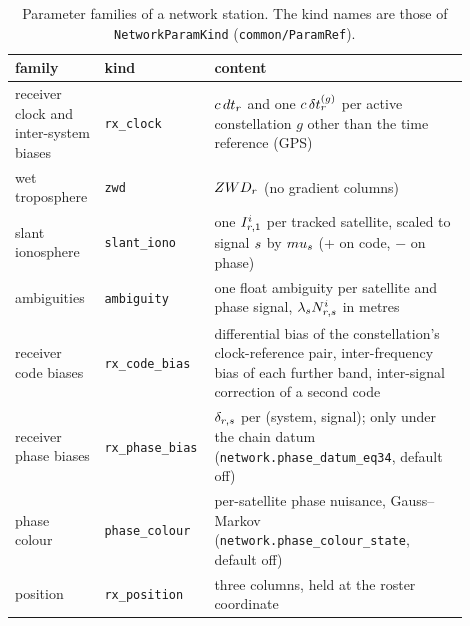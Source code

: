 \documentclass[main.tex]{subfiles}
\begin{document}
\begin{table}[tbp]
\centering
\caption{Parameter families of a network station. The kind names are
those of \texttt{NetworkParamKind} (\texttt{common/ParamRef}).}
\label{tab:net-params}
\footnotesize
\begin{tabular}{@{}>{\raggedright\arraybackslash}p{0.19\linewidth}>{\raggedright\arraybackslash}p{0.17\linewidth}>{\raggedright\arraybackslash}p{0.54\linewidth}@{}}
\toprule
family & kind & content \\
\midrule
receiver clock and inter-system biases & \texttt{rx\_clock} & $c\,dt_r$ and one $c\,\delta t^{(g)}_r$ per active constellation $g$ other than the time reference (GPS) \\
wet troposphere & \texttt{zwd} & $ZWD_r$ (no gradient columns) \\
slant ionosphere & \texttt{slant\_iono} & one $I^i_{r,1}$ per tracked satellite, scaled to signal $s$ by $mu_s$ (+ on code, $-$ on phase) \\
ambiguities & \texttt{ambiguity} & one float ambiguity per satellite and phase signal, $\lambda_s N^i_{r,s}$ in metres \\
receiver code biases & \texttt{rx\_code\_bias} & differential bias of the constellation's clock-reference pair, inter-frequency bias of each further band, inter-signal correction of a second code \\
receiver phase biases & \texttt{rx\_phase\_bias} & $\delta_{r,s}$ per (system, signal); only under the chain datum (\texttt{network.phase\_datum\_eq34}, default off) \\
phase colour & \texttt{phase\_colour} & per-satellite phase nuisance, Gauss--Markov (\texttt{network.phase\_colour\_state}, default off) \\
position & \texttt{rx\_position} & three columns, held at the roster coordinate \\
\bottomrule
\end{tabular}
\end{table}
\end{document}
